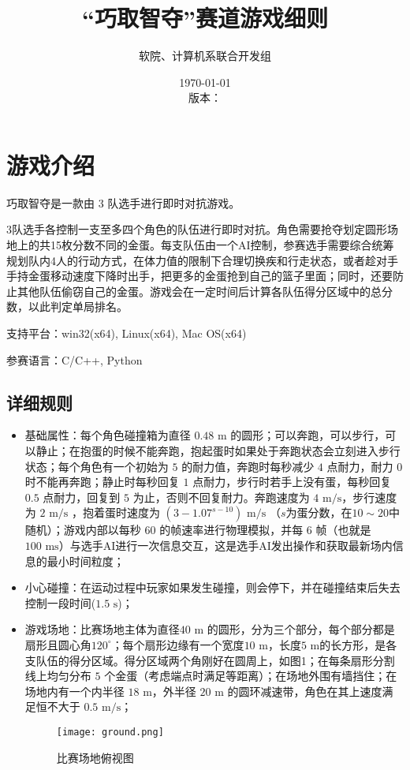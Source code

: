 \documentclass[UTF8]{article}
\title{“巧取智夺”赛道游戏细则}
\author{软院、计算机系联合开发组}
\date{\today\\版本：\gitAbbrevHash}
\begin{document}
\maketitle


\section{游戏介绍}

巧取智夺是一款由 3 队选手进行即时对抗游戏。

3队选手各控制一支至多四个角色的队伍进行即时对抗。角色需要抢夺划定圆形场地上的共15枚分数不同的金蛋。每支队伍由一个AI控制，参赛选手需要综合统筹规划队内4人的行动方式，在体力值的限制下合理切换疾和行走状态，或者趁对手手持金蛋移动速度下降时出手，把更多的金蛋抢到自己的篮子里面；同时，还要防止其他队伍偷窃自己的金蛋。游戏会在一定时间后计算各队伍得分区域中的总分数，以此判定单局排名。

支持平台：win32(x64), Linux(x64), Mac OS(x64)

参赛语言：C/C++, Python

\hypertarget{header-n7}{%
\subsection{详细规则}\label{header-n7}}

\begin{itemize}
\item
  基础属性：每个角色碰撞箱为直径 \(0.48 \text{ m}\)
  的圆形；可以奔跑，可以步行，可以静止；在抱蛋的时候不能奔跑，抱起蛋时如果处于奔跑状态会立刻进入步行状态；每个角色有一个初始为
  \(5\) 的耐力值，奔跑时每秒减少 \(4\) 点耐力，耐力 \( 0 \)
  时不能再奔跑；静止时每秒回复 \(1\)
  点耐力，步行时若手上没有蛋，每秒回复 \( 0.5 \) 点耐力，回复到 \(5 \)
  为止，否则不回复耐力。奔跑速度为 \(4\text{ m/s}\)，步行速度为
  \(2\text{ m/s}\) ，抱着蛋时速度为 \((3-1.07^{s-10})\text{ m/s}\)
  （\(s\)为蛋分数，在\(10\sim20\)中随机）；游戏内部以每秒 \(60\)
  的帧速率进行物理模拟，并每 \(6\) 帧（也就是
  \(100\text{ ms}\)）与选手AI进行一次信息交互，这是选手AI发出操作和获取最新场内信息的最小时间粒度；
\item
  小心碰撞：在运动过程中玩家如果发生碰撞，则会停下，并在碰撞结束后失去控制一段时间(\(1.5\text{ s}\))；
\item
  游戏场地：比赛场地主体为直径\( 40\text{ m}\)
  的圆形，分为三个部分，每个部分都是扇形且圆心角\(120^\circ\)；每个扇形边缘有一个宽度\( 10\text{ m}\)，长度\( 5\text{ m} \)的长方形，是各支队伍的得分区域。得分区域两个角刚好在圆周上，如图1；在每条扇形分割线上均匀分布
  \(5\)
  个金蛋（考虑端点时满足等距离）；在场地外围有墙挡住；在场地内有一个内半径
  \(18\text{ m}\)，外半径 \(20\text{ m}\)
  的圆环减速带，角色在其上速度满足恒不大于 \(0.5\text{ m/s}\)；
  \begin{figure}[ht]

    \centering
    \texttt{[image: ground.png]}
    \caption{比赛场地俯视图}
    \end{figure}
\end{itemize}
\end{document}
